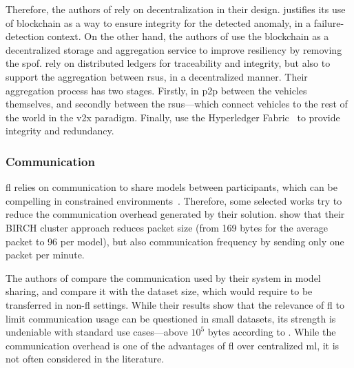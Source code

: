 Therefore, the authors of \cite{zhang_BlockchainbasedFederatedLearning_2020,rathore_BlockSecIoTNetBlockchainbaseddecentralized_2019,liu_BlockchainFederatedLearning_2021,hei_trustedfeatureaggregator_2020} rely on decentralization in their design.
\textcite{zhang_BlockchainbasedFederatedLearning_2020} justifies its use of blockchain as a way to ensure integrity for the detected anomaly, in a failure-detection context.
On the other hand, the authors of \cite{rathore_BlockSecIoTNetBlockchainbaseddecentralized_2019} use the blockchain as a decentralized storage and aggregation service to improve resiliency by removing the \gls{spof}.
\textcite{liu_BlockchainFederatedLearning_2021} rely on distributed ledgers for traceability and integrity, but also to support the aggregation between \glspl{rsu}, in a decentralized manner.
Their aggregation process has two stages.
Firstly, in \gls{p2p} between the vehicles themselves, and secondly between the \glspl{rsu}---which connect vehicles to the rest of the world in the \gls{v2x} paradigm.
Finally, \textcite{hei_trustedfeatureaggregator_2020} use the Hyperledger Fabric~\cite{Androulaki2018} to provide integrity and redundancy.

\subsubsection{Communication}
\label{sec:sota.quali.comm}

\Gls{fl} relies on communication to share models between participants, which can be compelling in constrained environments~\cite{qin_LineSpeedScalableIntrusion_2020a}.
Therefore, some selected works try to reduce the communication overhead generated by their solution.
\textcite{pahl_AllEyesYou_2018} show that their BIRCH cluster approach reduces packet size (from 169 bytes for the average packet to 96 per model), but also communication frequency by sending only one packet per minute.

The authors of \cite{schneble_Attackdetectionusing_2019,zhang_BlockchainbasedFederatedLearning_2020} compare the communication used by their system in model sharing, and compare it with the dataset size, which would require to be transferred in non-\gls{fl} settings.
While their results show that the relevance of \gls{fl} to limit communication usage can be questioned in small datasets, its strength is undeniable with standard use cases---above \(10^5\) bytes according to \cite{zhang_BlockchainbasedFederatedLearning_2020}.
While the communication overhead is one of the advantages of \gls{fl} over centralized \gls{ml}, it is not often considered in the literature.

